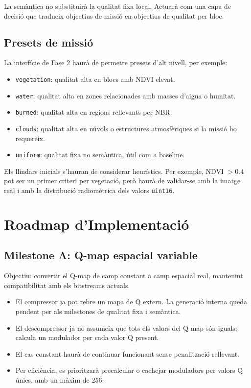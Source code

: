 \documentclass[11pt,a4paper]{article}
\begin{document}
La semàntica no substituirà la qualitat fixa local. Actuarà com una capa de decisió que tradueix objectius de missió en objectius de qualitat per bloc.

\subsection{Presets de missió}

La interfície de Fase 2 haurà de permetre presets d'alt nivell, per exemple:
\begin{itemize}
  \item \texttt{vegetation}: qualitat alta en blocs amb NDVI elevat.
  \item \texttt{water}: qualitat alta en zones relacionades amb masses d'aigua o humitat.
  \item \texttt{burned}: qualitat alta en regions rellevants per NBR.
  \item \texttt{clouds}: qualitat alta en núvols o estructures atmosfèriques si la missió ho requereix.
  \item \texttt{uniform}: qualitat fixa no semàntica, útil com a baseline.
\end{itemize}

Els llindars inicials s'hauran de considerar heurístics. Per exemple, NDVI $>0.4$ pot ser un primer criteri per vegetació, però haurà de validar-se amb la imatge real i amb la distribució radiomètrica dels valors \texttt{uint16}.

\section{Roadmap d'Implementació}

\subsection{Milestone A: Q-map espacial variable}

Objectiu: convertir el Q-map de camp constant a camp espacial real, mantenint compatibilitat amb els bitstreams actuals.

\begin{itemize}
  \item El compressor ja pot rebre un mapa de Q extern. La generació interna queda pendent per als milestones de qualitat fixa i semàntica.
  \item El descompressor ja no assumeix que tots els valors del Q-map són iguals; calcula un modulador per cada valor Q present.
  \item El cas constant haurà de continuar funcionant sense penalització rellevant.
  \item Per eficiència, es prioritzarà precalcular o cachejar moduladors per valors Q únics, amb un màxim de 256.
\end{itemize}
\end{document}
